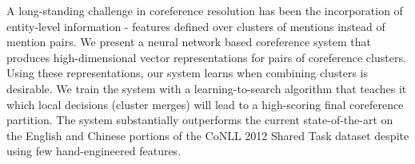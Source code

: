 A long-standing challenge in coreference resolution has been the incorporation of entity-level information - features defined over clusters of mentions instead of mention pairs. We present a neural network based coreference system that produces high-dimensional vector representations for pairs of coreference clusters. Using these representations, our system learns when combining clusters is desirable. We train the system with a learning-to-search algorithm that teaches it which local decisions (cluster merges) will lead to a high-scoring final coreference partition. The system substantially outperforms the current state-of-the-art on the English and Chinese portions of the  CoNLL 2012 Shared Task dataset despite using few hand-engineered features.
